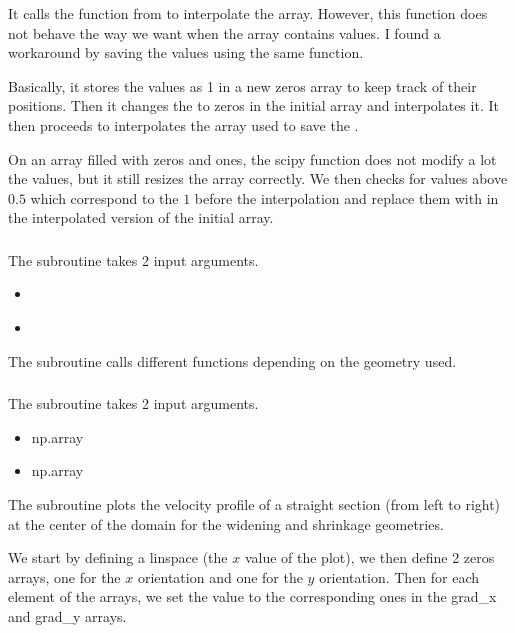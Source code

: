 It calls the function  from  to interpolate
the array. However, this function does not behave the way we want when the
array contains  values. I found a workaround\cite{interp} by saving
the  values using the same function.

Basically, it stores the  values as 1 in a new zeros array to keep
track of their positions. Then it changes the  to zeros in the
initial array and interpolates it. It then proceeds to interpolates the array
used to save the .

On an array filled with zeros and ones, the scipy function does not modify a
lot the values, but it still resizes the array correctly. We then checks for
values above $0.5$ which correspond to the $1$ before the interpolation and
replace them with  in the interpolated version of the initial array.

\subsubsection{}
The subroutine \textcolor{func}{} takes 2 input arguments.
\begin{itemize}
      \item {} \textcolor{dtype}{}
      \item {} \textcolor{dtype}{}
\end{itemize}
The subroutine calls different functions depending on the geometry used.

\subsubsection{}
The subroutine \textcolor{func}{} takes 2 input
arguments.
\begin{itemize}
      \item {} \textcolor{dtype}{np.array}
      \item {} \textcolor{dtype}{np.array}
\end{itemize}
The subroutine plots the velocity profile of a straight section (from left to
right) at the center of the domain for the widening and shrinkage geometries.

We start by defining a linspace (the $x$ value of the plot), we then define
2 zeros arrays, one for the $x$ orientation and one for the $y$ orientation.
Then for each element of the arrays, we set the value to the corresponding ones
in the grad\_x and grad\_y arrays.

